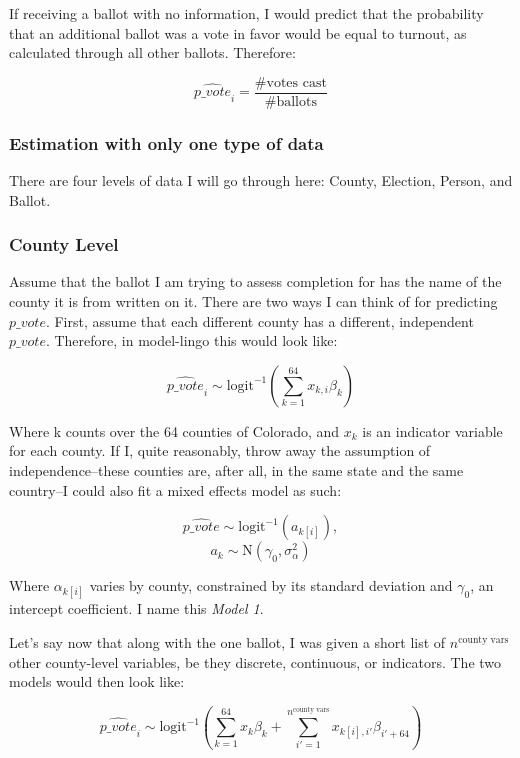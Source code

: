 \documentclass[12pt,twoside]{reedthesis}
\begin{document}
  If receiving a ballot with no information, I would predict that the
  probability that an additional ballot was a vote in favor would be equal
  to turnout, as calculated through all other ballots. Therefore:
  
  \[\hat{p\_vote}_i = \frac{\# \text{votes cast}}{\# \text{ballots}}\]
  
  \subsubsection{Estimation with only one type of
  data}\label{estimation-with-only-one-type-of-data}
  
  There are four levels of data I will go through here: County, Election,
  Person, and Ballot.
  
  \subsubsection{County Level}\label{county-level}
  
  Assume that the ballot I am trying to assess completion for has the name
  of the county it is from written on it. There are two ways I can think
  of for predicting \(p\_vote\). First, assume that each different county
  has a different, independent \(p\_vote\). Therefore, in model-lingo this
  would look like:
  
  \[\hat{p\_vote}_i \sim \text{logit}^{-1}(\sum_{k = 1}^{64}x_{k,i}\beta_{k})\]
  
  Where k counts over the 64 counties of Colorado, and \(x_{k}\) is an
  indicator variable for each county. If I, quite reasonably, throw away
  the assumption of independence--these counties are, after all, in the
  same state and the same country--I could also fit a mixed effects model
  as such:
  
  \[\hat{p\_vote} \sim \text{logit}^{-1}(a_{k[i]}), \]
  \[a_{k} \sim \text{N}(\gamma_0, \sigma_{\alpha}^2)\]
  
  Where \(\alpha_{k[i]}\) varies by county, constrained by its standard
  deviation and \(\gamma_0\), an intercept coefficient. I name this
  \emph{Model 1}.
  
  Let's say now that along with the one ballot, I was given a short list
  of \(n^{\text{county vars}}\) other county-level variables, be they
  discrete, continuous, or indicators. The two models would then look
  like:
  
  \[\hat{p\_vote}_i \sim \text{logit}^{-1}(\sum_{k = 1}^{64}x_{k}\beta_{k} + \sum_{i'=1}^{n^{\text{county vars}}}x_{k[i], i'}\beta_{i'+64})\]
  
\end{document}
